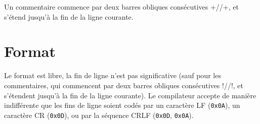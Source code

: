 Un commentaire commence par deux barres obliques consécutives \omnibus+//+, et s’étend jusqu’à la fin de la ligne courante.




\section{Format}

Le format est libre, la fin de ligne n’est pas significative (sauf pour les commentaires, qui commencent par deux barres obliques consécutives \omnibus!//!, et s’étendent jusqu’à la fin de la ligne courante). Le compilateur accepte de manière indifférente que les fins de ligne soient codés par un caractère LF (\texttt{0x0A}), un caractère CR (\texttt{0x0D}), ou par la séquence CRLF (\texttt{0x0D}, \texttt{0x0A}).

